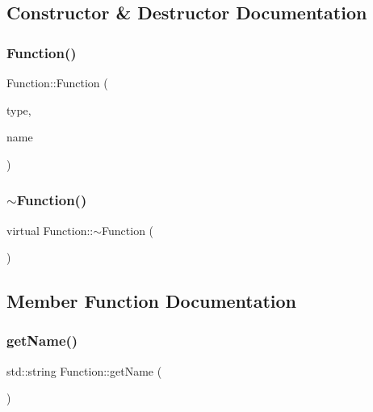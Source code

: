 \subsection{Constructor \& Destructor Documentation}
\mbox{\label{classFunction_a3bcd0502247ea1545853f1f6126b5fe1}} 
\subsubsection{\texorpdfstring{Function()}{Function()}}
{\footnotesize\ttfamily Function\+::\+Function (\begin{DoxyParamCaption}\item[{\hyperlink{statics_8h_a025d9866e39f51183a23b3e2165f0e77}{F\+U\+N\+C\+T\+I\+O\+N\+\_\+\+T\+Y\+PE}}]{type,  }\item[{std\+::string}]{name }\end{DoxyParamCaption})}

\mbox{\label{classFunction_a8697b2e490a4314a7ccbb17aea8ce537}} 
\subsubsection{\texorpdfstring{$\sim$\+Function()}{~Function()}}
{\footnotesize\ttfamily virtual Function\+::$\sim$\+Function (\begin{DoxyParamCaption}{ }\end{DoxyParamCaption})\hspace{0.3cm}{\ttfamily [virtual]}}



\subsection{Member Function Documentation}
\mbox{\label{classFunction_a5b7d859d767e8a9c19fc5b81a0d10395}} 
\subsubsection{\texorpdfstring{get\+Name()}{getName()}}
{\footnotesize\ttfamily std\+::string Function\+::get\+Name (\begin{DoxyParamCaption}{ }\end{DoxyParamCaption})}

